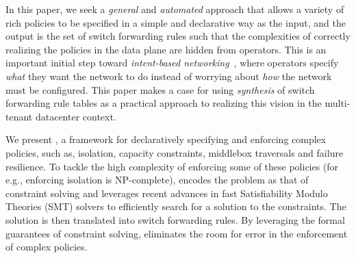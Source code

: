 

In this paper, we seek a {\em general} and {\em automated} approach
that allows a variety of rich policies to be specified in a simple and
declarative way as the input, and the output is the set of switch
forwarding rules such that the complexities of correctly realizing the
policies in the data plane are hidden from operators. This is an
important initial step toward {\em intent-based
  networking}~\cite{intent}, where operators specify {\em what} they
want the network to do instead of worrying about {\em how} the network
must be configured.
This paper makes a case for using \emph{synthesis} of switch
forwarding rule tables as a practical approach to realizing this
vision in the multi-tenant datacenter context.

We present \Name, a framework for declaratively specifying and
enforcing complex policies, such as, isolation, capacity constraints,
middlebox traversals and failure resilience. To tackle the high
complexity of enforcing some of these policies (for e.g., enforcing
isolation is NP-complete), \Name encodes the problem as that of
constraint solving and leverages recent advances in
fast Satisfiability Modulo Theories (SMT) solvers to efficiently
search for a solution to the constraints.  The solution is then
translated into switch forwarding rules.
By leveraging the formal guarantees of constraint solving, \Name
eliminates the room for error in the enforcement of complex
policies.

